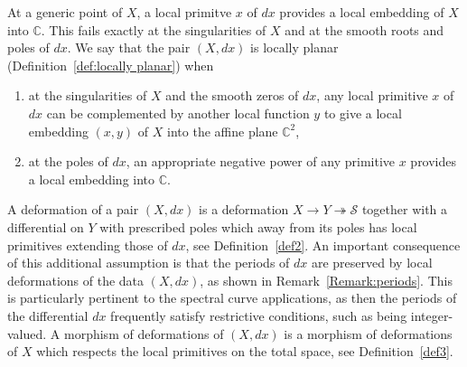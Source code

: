 \documentclass[11pt,twoside]{amsart}
\theoremstyle{plain}
\newcommand{\C}{\mathbb{C}}
\newcommand{\Sm}{\mathcal{S}}
\newcommand{\dfx}{dx}
\begin{document}
At a generic point of $X$, a local primitve $x$ of $\dfx$ provides a local embedding of $X$ into $\C$. This fails exactly at the singularities of $X$ and at the smooth roots and poles of $\dfx$.
We say that the pair $ (X,\dfx) $ is locally planar (Definition~\ref{def:locally planar}) when 
\begin{enumerate}
\item at the singularities of $X$ and the smooth zeros of $\dfx$, any local primitive $ x $ of $\dfx $ can be complemented by another local function $ y $ to give a local embedding $ (x, y) $ of $ X $ into the affine plane $\C ^ 2 $,
\item at the poles of $\dfx$, an appropriate negative power of any primitive $x$ provides a local embedding into $\C$.
\end{enumerate}




A deformation of a pair $(X,\dfx) $ is a deformation $X \to Y \twoheadrightarrow \Sm$ together with a  differential on $Y$ with prescribed poles which away from its poles has local primitives extending those of $\dfx $, see Definition~\ref{def2}. An important consequence of this additional assumption is  that the periods of $\dfx $ are preserved by local deformations of the data $(X,\dfx) $, as shown in Remark~\ref {Remark:periods}. This is particularly pertinent to the spectral curve applications, as then the periods of the differential $\dfx $ frequently satisfy restrictive conditions, such as being integer-valued. 
A morphism of deformations of $ (X,\dfx ) $ is a morphism of deformations of $ X $ which respects the local primitives on the total space, see Definition~\ref{def3}. 
\end{document}
